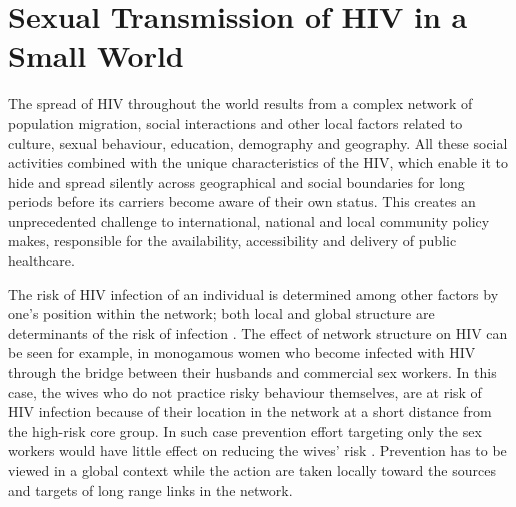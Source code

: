 \chapter{Sexual Transmission of HIV in a Small World}\label{chpmodel}

The spread of HIV throughout the world results from a complex network of population
migration, social interactions and other local factors related to culture, sexual
behaviour, education, demography and geography. All these social activities combined with
the unique characteristics of the HIV, which enable it to hide and spread silently across
geographical and social boundaries for long periods before its carriers become aware of
their own status. This creates an unprecedented challenge to international, national and
local community policy makes, responsible for the availability, accessibility and
delivery of public healthcare.

The risk of HIV infection of an individual is determined among other factors by one's
position within the network; both local and global structure are determinants of the risk
of infection \cite{Ghani2000}. The effect of network structure on HIV can be seen for
example, in monogamous women who become infected with HIV through the bridge between
their husbands and  commercial sex workers. In this case, the wives who do not practice
risky behaviour themselves, are at risk of HIV infection because of their location in the
network at a short distance from the high-risk core group. In such case prevention effort
targeting only the sex workers would have little effect on reducing the wives' risk
\cite{Morris1996}. Prevention has to be viewed in a global context while the action are
taken locally toward the sources and targets of long range links in the network.

